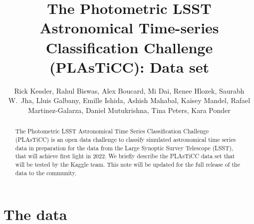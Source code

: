 \documentclass[\docopts]{\docclass}
\author{Rick Kessler,  Rahul Biswas, Alex Boucard, Mi Dai, Renee Hlozek,
Saurabh W.~Jha, Lluis Galbany, Emille Ishida, Ashish Mahabal, Kaisey Mandel, Rafael Martinez-Galarza, Daniel Mutukrishna, Tina Peters, Kara Ponder}
\begin{document}
\title{The Photometric LSST Astronomical Time-series Classification Challenge (PLAsTiCC): Data set}


\begin{abstract}
The Photometric LSST Astronomical Time Series Classification Challenge (PLAsTiCC) is an open data challenge to classify simulated astronomical time series data in preparation for the data from the Large Synoptic Survey Telescope (LSST), that will achieve first light in 2022. We briefly describe the PLAsTiCC data set that will be tested by the Kaggle team. This note will be updated for the full release of the data to the community.

\end{abstract}

\dockeys{}

\maketitlepost


\section{The data}
\label{sec:thedata}
\end{document}
